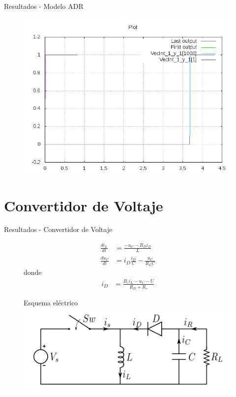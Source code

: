 \documentclass{beamer}
\begin{document}
\begin{frame}{Resultados - Modelo ADR}
\begin{figure}[H]
 \includegraphics[width=\linewidth]{output/adr/adr-all}
\end{figure}
\end{frame}

\section{Convertidor de Voltaje}
\begin{frame}{Resultados - Convertidor de Voltaje}
\begin{figure}
\begin{minipage}{0.5\textwidth}
\begin{align*}
\frac{di_{L}}{dt} & = \frac{-u_{C} - R_D i_D }{L}\\
\frac{du_C}{dt} & =i_D \frac{i_D}{C} - \frac{u_C}{R_L C }
\end{align*}
donde
\begin{align*}
i_D & = \frac{R_s i_L - u_C - U }{R_D + R_s}
\end{align*}
\end{minipage}\hfill\begin{minipage}{0.5\textwidth}
\centering
Esquema eléctrico \\
 \includegraphics[width=\linewidth]{Buckboost_conventions}
\end{minipage}
\end{figure}
\end{frame}
\end{document}
